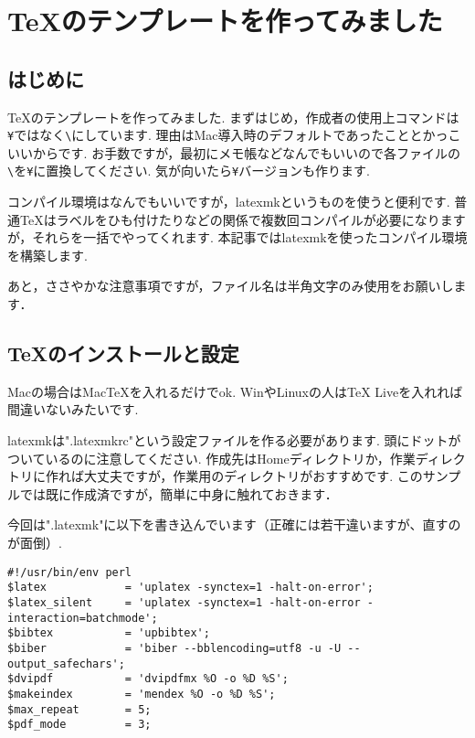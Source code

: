 

\chapter{TeXのテンプレートを作ってみました}

\setcounter{page}{1}


\section{はじめに}
TeXのテンプレートを作ってみました.
まずはじめ，作成者の使用上コマンドは\verb|¥|ではなく\verb|\|にしています.
理由はMac導入時のデフォルトであったこととかっこいいからです.
お手数ですが，最初にメモ帳などなんでもいいので各ファイルの\verb|\|を\verb|¥|に置換してください.
気が向いたら\verb|¥|バージョンも作ります.

コンパイル環境はなんでもいいですが，latexmkというものを使うと便利です.
普通TeXはラベルをひも付けたりなどの関係で複数回コンパイルが必要になりますが，それらを一括でやってくれます.
本記事ではlatexmkを使ったコンパイル環境を構築します.

あと，ささやかな注意事項ですが，ファイル名は半角文字のみ使用をお願いします．

\section{TeXのインストールと設定}

Macの場合はMacTeXを入れるだけでok.
WinやLinuxの人はTeX Liveを入れれば間違いないみたいです.

latexmkは".latexmkrc"という設定ファイルを作る必要があります.
頭にドットがついているのに注意してください.
作成先はHomeディレクトリか，作業ディレクトリに作れば大丈夫ですが，作業用のディレクトリがおすすめです.
このサンプルでは既に作成済ですが，簡単に中身に触れておきます．

今回は".latexmk"に以下を書き込んでいます（正確には若干違いますが、直すのが面倒）.

\begin{verbatim}
#!/usr/bin/env perl
$latex            = 'uplatex -synctex=1 -halt-on-error';
$latex_silent     = 'uplatex -synctex=1 -halt-on-error -interaction=batchmode';
$bibtex           = 'upbibtex';
$biber            = 'biber --bblencoding=utf8 -u -U --output_safechars';
$dvipdf           = 'dvipdfmx %O -o %D %S';
$makeindex        = 'mendex %O -o %D %S';
$max_repeat       = 5;
$pdf_mode         = 3;
\end{verbatim}

